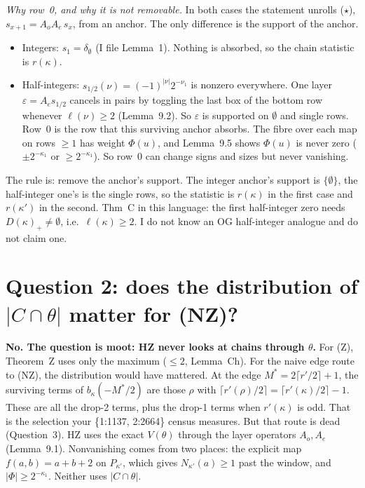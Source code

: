 \documentclass[10pt]{amsart}
\theoremstyle{remark}
\begin{document}
\emph{Why row~0, and why it is not removable.} In both cases the statement unrolls (\(\star\)), $s_{x+1}=A_oA_e\,s_x$,
from an anchor. The only difference is the support of the anchor.
\begin{itemize}
\item Integers: $s_1=\delta_\emptyset$ (I file Lemma~1). Nothing is absorbed, so the chain statistic is $r(\kappa)$.
\item Half-integers: $s_{1/2}(\nu)=(-1)^{|\nu|}2^{-\nu_1}$ is nonzero everywhere. One layer
  $\varepsilon=A_e s_{1/2}$ cancels in pairs by toggling the last box of the bottom row whenever $\ell(\nu)\ge2$
  (Lemma~9.2). So $\varepsilon$ is supported on $\emptyset$ and single rows. Row~0 is the row that this surviving anchor
  absorbs. The fibre over each map on rows $\ge1$ has weight $\Phi(u)$, and Lemma~9.5 shows $\Phi(u)$ is never zero
  ($\pm2^{-\kappa_1}$ or $\ge2^{-\kappa_1}$). So row~0 can change signs and sizes but never vanishing.
\end{itemize}
The rule is: remove the anchor's support. The integer anchor's support is $\{\emptyset\}$, the half-integer one's is the
single rows, so the statistic is $r(\kappa)$ in the first case and $r(\kappa')$ in the second. Thm~C in this language: the
first half-integer zero needs $D(\kappa)_+\ne\emptyset$, i.e.\ $\ell(\kappa)\ge2$. I do not know an OG half-integer
analogue and do not claim one.

\section{Question 2: does the distribution of $|C\cap\theta|$ matter for (NZ)?}
\textbf{No. The question is moot: HZ never looks at chains through $\theta$.} For (Z), Theorem~Z uses only the maximum
($\le2$, Lemma~Ch). For the naive edge route to (NZ), the distribution would have mattered. At the edge
$M^*=2\lceil r'/2\rceil+1$, the surviving terms of $b_\kappa(-M^*/2)$ are those $\rho$ with
$\lceil r'(\rho)/2\rceil=\lceil r'(\kappa)/2\rceil-1$. These are all the drop-2 terms, plus the drop-1 terms when
$r'(\kappa)$ is odd. That is the selection your \{1:1137, 2:2664\} census measures. But that route is dead (Question~3).
HZ uses the exact $V(\theta)$ through the layer operators $A_o,A_e$ (Lemma~9.1). Nonvanishing comes from two places:
the explicit map $f(a,b)=a+b+2$ on $P_{\kappa'}$, which gives $N_{\kappa'}(a)\ge1$ past the window, and
$|\Phi|\ge2^{-\kappa_1}$. Neither uses $|C\cap\theta|$.
\end{document}
